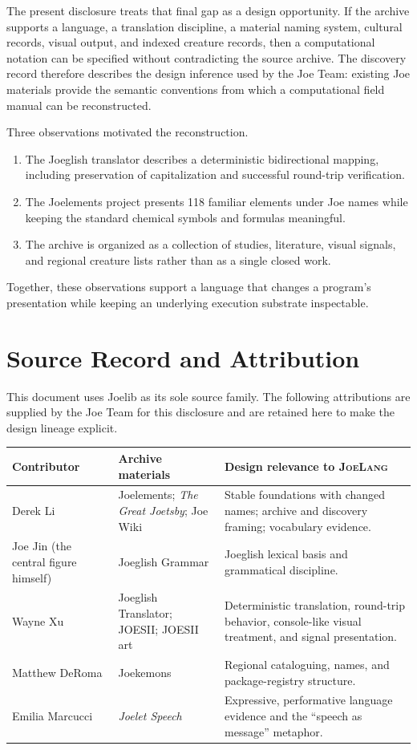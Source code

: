 \documentclass[12pt]{article}
\newcommand{\JoeLang}{\textsc{JoeLang}}
\begin{document}
The present disclosure treats that final gap as a design opportunity. If the archive supports a language, a translation discipline, a material naming system, cultural records, visual output, and indexed creature records, then a computational notation can be specified without contradicting the source archive. The discovery record therefore describes the design inference used by the Joe Team: existing Joe materials provide the semantic conventions from which a computational field manual can be reconstructed.

Three observations motivated the reconstruction.
\begin{enumerate}
  \item The Joeglish translator describes a deterministic bidirectional mapping, including preservation of capitalization and successful round-trip verification.\cite{translatorReadme,translatorEngine}
  \item The Joelements project presents 118 familiar elements under Joe names while keeping the standard chemical symbols and formulas meaningful.\cite{joelements}
  \item The archive is organized as a collection of studies, literature, visual signals, and regional creature lists rather than as a single closed work.\cite{contributing,joekemon,joesii}
\end{enumerate}
Together, these observations support a language that changes a program's presentation while keeping an underlying execution substrate inspectable.

\clearpage
\section{Source Record and Attribution}
This document uses Joelib as its sole source family. The following attributions are supplied by the Joe Team for this disclosure and are retained here to make the design lineage explicit.

\begin{longtable}{p{}p{}p{}}
\toprule
\textbf{Contributor} & \textbf{Archive materials} & \textbf{Design relevance to \JoeLang}\\
\midrule
\endhead
Derek Li & Joelements; \emph{The Great Joetsby}; Joe Wiki & Stable foundations with changed names; archive and discovery framing; vocabulary evidence.\\
Joe Jin (the central figure himself) & Joeglish Grammar & Joeglish lexical basis and grammatical discipline.\\
Wayne Xu & Joeglish Translator; JOESII; JOESII art & Deterministic translation, round-trip behavior, console-like visual treatment, and signal presentation.\\
Matthew DeRoma & Joekemons & Regional cataloguing, names, and package-registry structure.\\
Emilia Marcucci & \emph{Joelet Speech} & Expressive, performative language evidence and the ``speech as message'' metaphor.\\
\bottomrule
\end{longtable}
\end{document}

